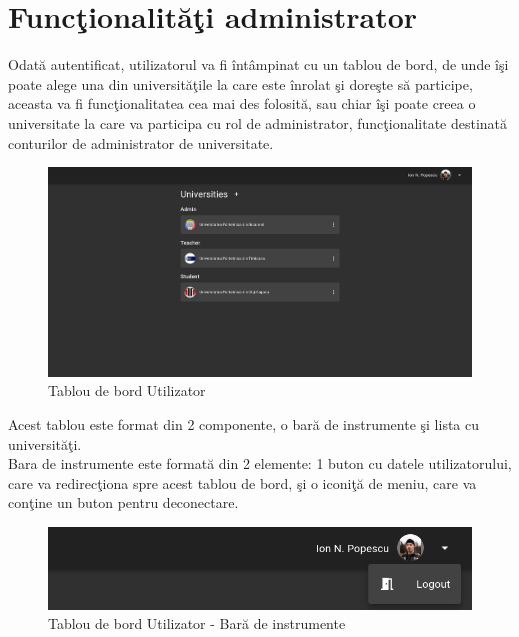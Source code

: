 \documentclass[12pt, a4paper, oneside, romanian]{teza-upb}
\begin{document}
\section{Funcţionalităţi administrator}

Odată autentificat, utilizatorul va fi întâmpinat cu un tablou de bord, de unde îşi poate alege una din universităţile la care este înrolat şi doreşte să participe, aceasta va fi funcţionalitatea cea mai des folosită, sau chiar îşi poate creea o universitate la care va participa cu rol de administrator, funcţionalitate destinată conturilor de administrator de universitate.

\begin{figure}[H]
\centering
\includegraphics*[width=\columnwidth]{tablou-de-bord-utilizator}
\caption{Tablou de bord Utilizator}
\label{tablou-de-bord-utilizator}
\end{figure}

Acest tablou este format din 2 componente, o bară de instrumente şi lista cu universităţi.\\

Bara de instrumente este formată din 2 elemente: 1 buton cu datele utilizatorului, care va redirecţiona spre acest tablou de bord, şi o iconiţă de meniu, care va conţine un buton pentru deconectare.

\begin{figure}[H]
\centering
\includegraphics*[width=\columnwidth]{tablou-de-bord-utilizator-bara-de-instrumente}
\caption{Tablou de bord Utilizator - Bară de instrumente}
\label{tablou-de-bord-utilizator-bara-de-instrumente}
\end{figure}
\end{document}
